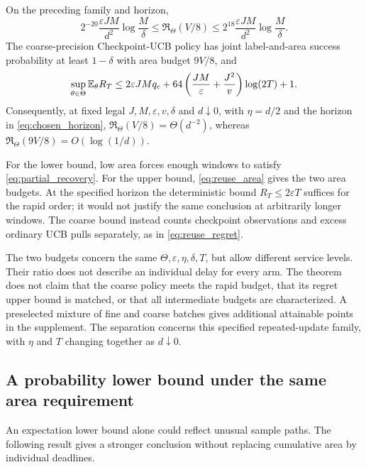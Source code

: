 \documentclass[11pt]{article}
\begin{document}
\begin{theorem}
\label{thm:tradeoff}
On the preceding family and horizon,
\begin{equation}
 2^{-20}\frac{\varepsilon JM}{d^2}\log\frac M\delta
 \le\mathfrak R_\Theta(V/8)\le
 2^{18}\frac{\varepsilon JM}{d^2}\log\frac M\delta.
 \label{eq:rapid_matched}
\end{equation}
The coarse-precision Checkpoint-UCB policy has joint label-and-area success
probability at least $1-\delta$ with area budget $9V/8$, and
\begin{equation}
 \sup_{\theta\in\Theta}\mathbb E_\theta R_T\le
 2\varepsilon JM q_c+
 64\left(\frac{JM}{\varepsilon}+\frac{J^2}{v}\right)\log(2T)+1.
 \label{eq:coarse_regret}
\end{equation}
Consequently, at fixed legal $J,M,\varepsilon,v,\delta$ and $d\downarrow0$,
with $\eta=d/2$ and the horizon in \eqref{eq:chosen_horizon},
$\mathfrak R_\Theta(V/8)=\Theta(d^{-2})$, whereas
$\mathfrak R_\Theta(9V/8)=O(\log(1/d))$.
\end{theorem}

For the lower bound, low area forces enough windows to satisfy
\eqref{eq:partial_recovery}. For the upper bound, \eqref{eq:reuse_area}
gives the two area budgets. At the specified horizon the deterministic bound
$R_T\le2\varepsilon T$ suffices for the rapid order; it would not justify
the same conclusion at arbitrarily longer windows. The coarse bound instead
counts checkpoint observations and excess ordinary UCB pulls separately,
as in \eqref{eq:reuse_regret}.

The two budgets concern the same $\Theta,\varepsilon,\eta,\delta,T$, but
allow different service levels. Their ratio does not describe an individual
delay for every arm. The theorem does not claim that the coarse policy meets
the rapid budget, that its regret upper bound is matched, or that all
intermediate budgets are characterized. A preselected mixture of fine and
coarse batches gives additional attainable points in the supplement. The
separation concerns this specified repeated-update family, with $\eta$ and
$T$ changing together as $d\downarrow0$.

\subsection{A probability lower bound under the same area requirement}

An expectation lower bound alone could reflect unusual sample paths. The
following result gives a stronger conclusion without replacing cumulative
area by individual deadlines.
\end{document}
